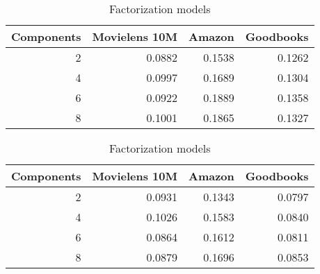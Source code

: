 \begin{table}
\caption{Effect of number of mixture components}
\label{tab:nummixtures}
\begin{subtable}{\columnwidth}
\caption{Sequence models}
\begin{tabular}{rrrr}
\toprule
   Components &   Movielens 10M &   Amazon &   Goodbooks \\
\midrule
            2 &          0.0882 &   0.1538 &      0.1262 \\
            4 &          0.0997 &   0.1689 &      0.1304 \\
            6 &          0.0922 &   0.1889 &      0.1358 \\
            8 &          0.1001 &   0.1865 &      0.1327 \\
\bottomrule
\end{tabular}
\end{subtable}
\begin{subtable}{\columnwidth}
\caption{Factorization models}
\begin{tabular}{rrrr}
\toprule
   Components &   Movielens 10M &   Amazon &   Goodbooks \\
\midrule
            2 &          0.0931 &   0.1343 &      0.0797 \\
            4 &          0.1026 &   0.1583 &      0.0840 \\
            6 &          0.0864 &   0.1612 &      0.0811 \\
            8 &          0.0879 &   0.1696 &      0.0853 \\
\bottomrule
\end{tabular}
\end{subtable}\end{table}